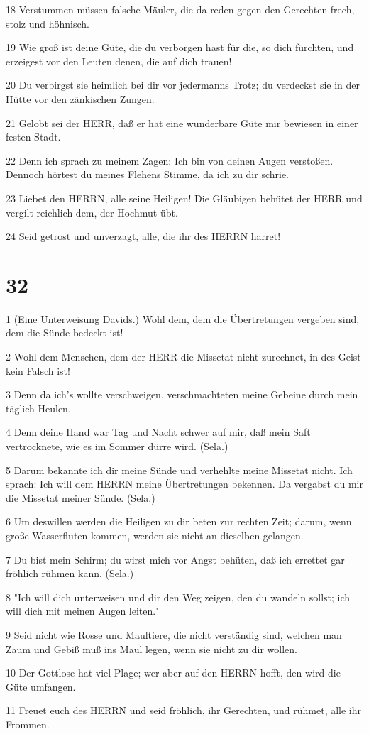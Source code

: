 \par 18 Verstummen müssen falsche Mäuler, die da reden gegen den Gerechten frech, stolz und höhnisch.
\par 19 Wie groß ist deine Güte, die du verborgen hast für die, so dich fürchten, und erzeigest vor den Leuten denen, die auf dich trauen!
\par 20 Du verbirgst sie heimlich bei dir vor jedermanns Trotz; du verdeckst sie in der Hütte vor den zänkischen Zungen.
\par 21 Gelobt sei der HERR, daß er hat eine wunderbare Güte mir bewiesen in einer festen Stadt.
\par 22 Denn ich sprach zu meinem Zagen: Ich bin von deinen Augen verstoßen. Dennoch hörtest du meines Flehens Stimme, da ich zu dir schrie.
\par 23 Liebet den HERRN, alle seine Heiligen! Die Gläubigen behütet der HERR und vergilt reichlich dem, der Hochmut übt.
\par 24 Seid getrost und unverzagt, alle, die ihr des HERRN harret!

\chapter{32}

\par 1 (Eine Unterweisung Davids.) Wohl dem, dem die Übertretungen vergeben sind, dem die Sünde bedeckt ist!
\par 2 Wohl dem Menschen, dem der HERR die Missetat nicht zurechnet, in des Geist kein Falsch ist!
\par 3 Denn da ich's wollte verschweigen, verschmachteten meine Gebeine durch mein täglich Heulen.
\par 4 Denn deine Hand war Tag und Nacht schwer auf mir, daß mein Saft vertrocknete, wie es im Sommer dürre wird. (Sela.)
\par 5 Darum bekannte ich dir meine Sünde und verhehlte meine Missetat nicht. Ich sprach: Ich will dem HERRN meine Übertretungen bekennen. Da vergabst du mir die Missetat meiner Sünde. (Sela.)
\par 6 Um deswillen werden die Heiligen zu dir beten zur rechten Zeit; darum, wenn große Wasserfluten kommen, werden sie nicht an dieselben gelangen.
\par 7 Du bist mein Schirm; du wirst mich vor Angst behüten, daß ich errettet gar fröhlich rühmen kann. (Sela.)
\par 8 "Ich will dich unterweisen und dir den Weg zeigen, den du wandeln sollst; ich will dich mit meinen Augen leiten."
\par 9 Seid nicht wie Rosse und Maultiere, die nicht verständig sind, welchen man Zaum und Gebiß muß ins Maul legen, wenn sie nicht zu dir wollen.
\par 10 Der Gottlose hat viel Plage; wer aber auf den HERRN hofft, den wird die Güte umfangen.
\par 11 Freuet euch des HERRN und seid fröhlich, ihr Gerechten, und rühmet, alle ihr Frommen.

